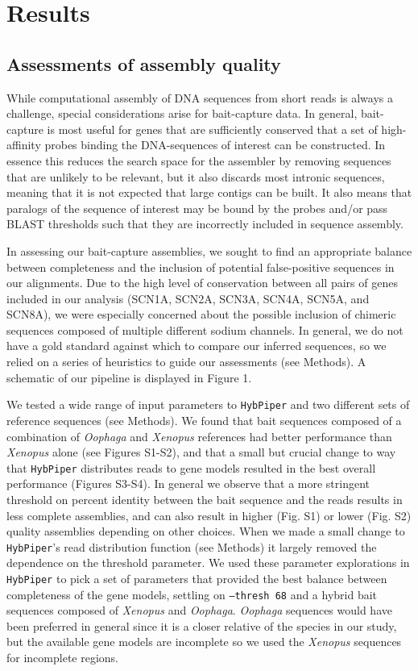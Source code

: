 \documentclass{article}
\begin{document}
\section*{Results}

\subsection*{Assessments of assembly quality}

While computational assembly of DNA sequences from short reads is always a challenge, special considerations arise for bait-capture data. In general, bait-capture is most useful for genes that are sufficiently conserved that a set of high-affinity probes binding the DNA-sequences of interest can be constructed.  In essence this reduces the search space for the assembler by removing sequences that are unlikely to be relevant, but it also discards most intronic sequences, meaning that it is not expected that large contigs can be built. It also means that paralogs of the sequence of interest may be bound by the probes and/or pass BLAST thresholds such that they are incorrectly included in sequence assembly.

In assessing our bait-capture assemblies, we sought to find an appropriate balance between completeness and the inclusion of potential false-positive sequences in our alignments.  Due to the high level of conservation between all pairs of genes included in our analysis (SCN1A, SCN2A, SCN3A, SCN4A, SCN5A, and SCN8A), we were especially concerned about the possible inclusion of chimeric sequences composed of multiple different sodium channels. In general, we do not have a gold standard against which to compare our inferred sequences, so we relied on a series of heuristics to guide our assessments (see Methods). A schematic of our pipeline is displayed in Figure 1.

We tested a wide range of input parameters to \texttt{HybPiper} and two different sets of reference sequences (see Methods). We found that bait sequences composed of a combination of \textit{Oophaga} and \textit{Xenopus} references had better performance than \textit{Xenopus} alone (see Figures S1-S2), and that a small but crucial change to way that \texttt{HybPiper}
distributes reads to gene models resulted in the best overall performance (Figures S3-S4). In general we observe that a more stringent threshold on percent identity between the bait sequence and the reads results in less complete assemblies, and can also result in higher (Fig. S1) or lower (Fig. S2) quality assemblies depending on other choices. When we made a small change to \texttt{HybPiper}'s read distribution function (see Methods) it largely removed the dependence on the threshold parameter. We used these parameter explorations in \texttt{HybPiper} to pick a set of parameters that provided the best balance between completeness of the gene models, settling on \texttt{--thresh 68} and a hybrid bait sequences composed of \textit{Xenopus} and \textit{Oophaga}. \textit{Oophaga} sequences would have been preferred in general since it is a closer relative of the species in our study, but the available gene models are incomplete so we used the \textit{Xenopus} sequences for incomplete regions. 
\end{document}
